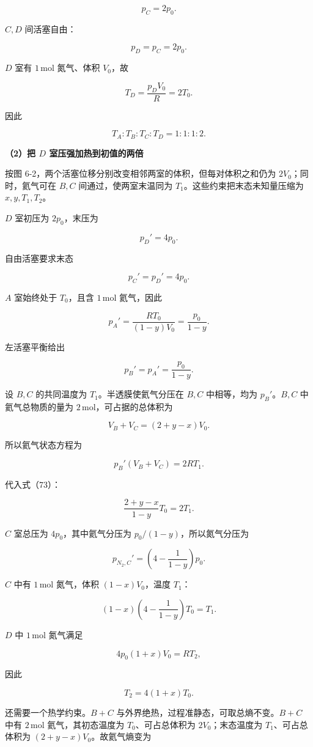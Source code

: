 \documentclass[12pt,a4paper,UTF8]{ctexart}
\begin{document}
\[p_C=2p_0.\]

\(C,D\) 间活塞自由：

\[p_D=p_C=2p_0.\]

\(D\) 室有 \(1\,\mathrm{mol}\) 氮气、体积 \(V_0\)，故

\[T_D=\frac{p_DV_0}{R}=2T_0.\]

因此

\[\boxed{T_A:T_B:T_C:T_D=1:1:1:2}. \tag{71}\]

\textbf{（2）把 \(D\) 室压强加热到初值的两倍}

按图 6-2，两个活塞位移分别改变相邻两室的体积，但每对体积之和仍为
\(2V_0\)；同时，氦气可在 \(B,C\) 间通过，使两室末温同为
\(T_1\)。这些约束把末态未知量压缩为 \(x,y,T_1,T_2\)。

\(D\) 室初压为 \(2p_0\)，末压为

\[p_D'=4p_0.\]

自由活塞要求末态

\[p_C'=p_D'=4p_0. \tag{72}\]

\(A\) 室始终处于 \(T_0\)，且含 \(1\,\mathrm{mol}\) 氦气，因此

\[p_A'=\frac{RT_0}{(1-y)V_0}=\frac{p_0}{1-y}.\]

左活塞平衡给出

\[p_B'=p_A'=\frac{p_0}{1-y}. \tag{73}\]

设 \(B,C\) 的共同温度为 \(T_1\)。半透膜使氦气分压在 \(B,C\) 中相等，均为
\(p_B'\)。\(B,C\) 中氦气总物质的量为
\(2\,\mathrm{mol}\)，可占据的总体积为

\[V_B+V_C=(2+y-x)V_0.\]

所以氦气状态方程为

\[p_B'(V_B+V_C)=2RT_1.\]

代入式（73）：

\[\boxed{\frac{2+y-x}{1-y}T_0=2T_1}. \tag{74}\]

\(C\) 室总压为 \(4p_0\)，其中氦气分压为 \(p_0/(1-y)\)，所以氮气分压为

\[p_{N_2,C}'=\left(4-\frac1{1-y}\right)p_0.\]

\(C\) 中有 \(1\,\mathrm{mol}\) 氮气，体积 \((1-x)V_0\)，温度 \(T_1\)：

\[\boxed{(1-x)\left(4-\frac1{1-y}\right)T_0=T_1}. \tag{75}\]

\(D\) 中 \(1\,\mathrm{mol}\) 氮气满足

\[4p_0(1+x)V_0=RT_2,\]

因此

\[\boxed{T_2=4(1+x)T_0}. \tag{76}\]

还需要一个热学约束。\(B+C\)
与外界绝热，过程准静态，可取总熵不变。\(B+C\) 中有 \(2\,\mathrm{mol}\)
氦气，其初态温度为 \(T_0\)、可占总体积为 \(2V_0\)；末态温度为
\(T_1\)、可占总体积为 \((2+y-x)V_0\)。故氦气熵变为
\end{document}
